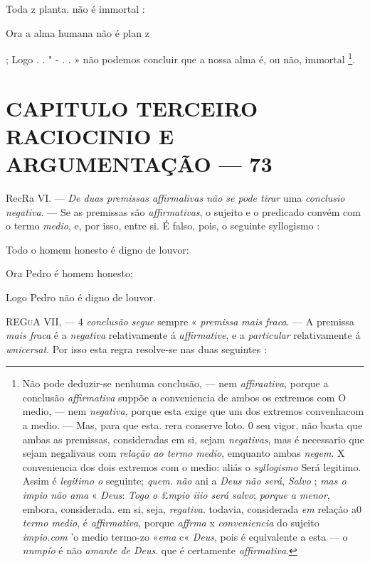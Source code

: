 Toda z planta. não é immortal :

Ora a alma humana não é plan z

; Logo . . " - . . » não podemos concluir que a nossa alma é, ou não, immortal \footnote{Não pode deduzir-se nenhuma conclusão, --- nem \emph{affiraativa}, porque a conclusão \emph{affirmativa} suppõe a conveniencia de ambos os extremos com O medio, --- nem \emph{negativa}, porque esta exige que um dos extremos convenhacom a medio. --- Mas, para que esta. rera conserve loto. 0 seu vigor, não basta que ambas as premissas, consideradas em si, sejam \emph{negativas}, mas é necessario que sejam negalivaus com \emph{relação ao termo medio}, emquanto ambas \emph{negem}. X conveniencia dos dois extremos com o medio: aliás o \emph{syllogismo} Será legitimo. Assim é \emph{legitimo o} seguinte; \emph{quem}. \emph{não} ani a \emph{Deus não será}, \emph{Salvo} ; \emph{mas o impio não ama} « \emph{Deus}: \emph{Togo o} £\emph{mpio iiio será salvo}; \emph{porque a menor}, embora, considerada. em si, seja, \emph{regativa}. todavia, considerada \emph{em} relação a0 \emph{termo medio}, é \emph{affirmativa}, porque \emph{affrma} x \emph{conveniencia} do sujeito \emph{impio.com} 'o medio termo-zo «\emph{ema} c« \emph{Deus}, pois é equivalente a esta --- o \emph{nnmpío} é não \emph{amante de Deus}. que é certamente \emph{affirmativa}.}.


\chapter*{CAPITULO TERCEIRO\\[0.3em]\large RACIOCINIO E ARGUMENTAÇÃO --- 73}

     RecRa VI. --- \emph{De duas premissas affirmalivas não se pode tirar} uma \emph{conclusio negativa}. --- Se as premissas são \emph{affirmativas}, o sujeito e o predicado convém com o termo \emph{medio}, e, por isso, entre si. É falso, pois, o seguinte syllogismo :

Todo o homem honesto é digno de louvor:

Ora Pedro é homem honesto;

Logo Pedro não é digno de louvor.

\textsc{REGuA} VII, --- 4 \emph{conclusão segue} sempre « \emph{premissa mais fraca}. --- A premissa \emph{mais fraca} é a \emph{negativa} relativamente á \emph{affirmative}, e a \emph{particular} relativamente á \emph{wnicersat}. Por isso esta regra resolve-se nas duas seguintes :

